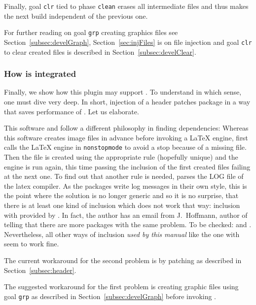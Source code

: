 Finally, goal \texttt{clr} tied to phase \texttt{clean} 
erases all intermediate files 
and thus makes the next build independent of the previous one. 


For further reading on goal \texttt{grp} creating graphics files 
see Section~\ref{subsec:develGraph}, 
Section~\ref{sec:injFiles} is on file injection and 
goal \texttt{clr} to clear created files is 
described in Section~\ref{subsec:develClear}. 
\medskip

\subsubsection{How  is integrated}\label{subsubsec:latexmkIntegration}

Finally, we show how this plugin may support . 
To understand in which sense, one must dive very deep. 
In short, injection of a header patches package  
in a way that saves performance of . 
Let us elaborate. 

This software and  
follow a different philosophy in finding dependencies: 
Whereas this software creates image files in advance 
before invoking a \LaTeX{} engine, 
 first calls the \LaTeX{} engine in \texttt{nonstopmode} 
to avoid a stop because of a missing file. 
Then the file is created using the appropriate rule (hopefully unique) 
and the engine is run again, 
this time passing the inclusion of the first created files 
failing at the next one. 
To find out that another rule is needed, 
 parses the LOG file of the latex compiler. 
As the packages write log messages in their own style, 
this is the point where the solution is no longer generic 
and so it is no surprise, 
that there is at least one kind of inclusion which does not work that way: 
inclusion with  provided by . 
In fact, the author has an email from J.~Hoffmann, author of  
telling that there are more packages with the same problem. 
To be checked:  and . 
Nevertheless, all other ways of inclusion \emph{used by this manual} 
like the one with  seem to work fine. 

The current workaround for the second problem 
is by patching  as described in Section~\ref{subsec:header}.

The suggested workaround for the first problem is 
creating graphic files using goal \texttt{grp} as described in Section~\ref{subsec:develGraph} 
before invoking . 

